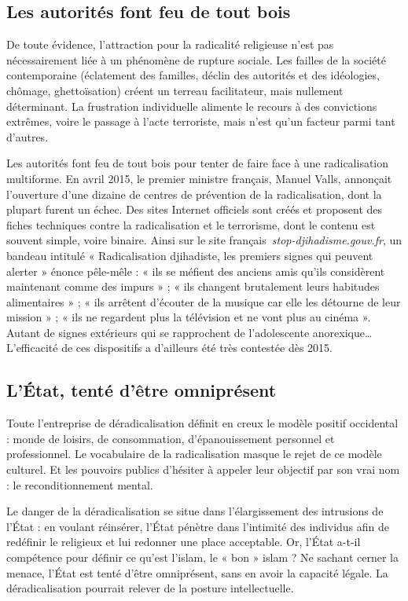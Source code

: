 \subsection{Les autorités font feu de tout bois}

De toute évidence, l'attraction pour la radicalité religieuse n'est pas
nécessairement liée à un phénomène de rupture sociale. Les failles de la
société contemporaine (éclatement des familles, déclin des autorités et
des idéologies, chômage, ghettoïsation) créent un terreau facilitateur,
mais nullement déterminant. La frustration individuelle alimente le
recours à des convictions extrêmes, voire le passage à l'acte
terroriste, mais n'est qu'un facteur parmi tant d'autres.

Les autorités font feu de tout bois pour tenter de faire face à une
radicalisation multiforme. En avril 2015, le premier ministre français,
Manuel Valls, annonçait l'ouverture d'une dizaine de centres de
prévention de la radicalisation, dont la plupart furent un échec. Des
sites Internet officiels sont créés et proposent des fiches techniques
contre la radicalisation et le terrorisme, dont le contenu est souvent
simple, voire binaire. Ainsi sur le site
français~\emph{stop-djihadisme.gouv.fr}, un bandeau intitulé «
Radicalisation djihadiste, les premiers signes qui peuvent alerter »
énonce pêle-mêle : « ils se méfient des anciens amis qu'ils considèrent
maintenant comme des impurs » ; « ils changent brutalement leurs
habitudes alimentaires » ; « ils arrêtent d'écouter de la musique car
elle les détourne de leur mission » ; « ils ne regardent plus la
télévision et ne vont plus au cinéma ». Autant de signes extérieurs qui
se rapprochent de l'adolescente anorexique\ldots{} L'efficacité de ces
dispositifs a d'ailleurs été très contestée dès 2015.

\subsection{L'État, tenté d'être omniprésent}

Toute l'entreprise de déradicalisation définit en creux le modèle
positif occidental : monde de loisirs, de consommation, d'épanouissement
personnel et professionnel. Le vocabulaire de la radicalisation masque
le rejet de ce modèle culturel. Et les pouvoirs publics d'hésiter à
appeler leur objectif par son vrai nom : le reconditionnement mental.

Le danger de la déradicalisation se situe dans l'élargissement des
intrusions de l'État : en voulant réinsérer, l'État pénètre dans
l'intimité des individus afin de redéfinir le religieux et lui redonner
une place acceptable. Or, l'État a-t-il compétence pour définir ce
qu'est l'islam, le « bon » islam ? Ne sachant cerner la menace, l'État
est tenté d'être omniprésent, sans en avoir la capacité légale. La
déradicalisation pourrait relever de la posture intellectuelle.

